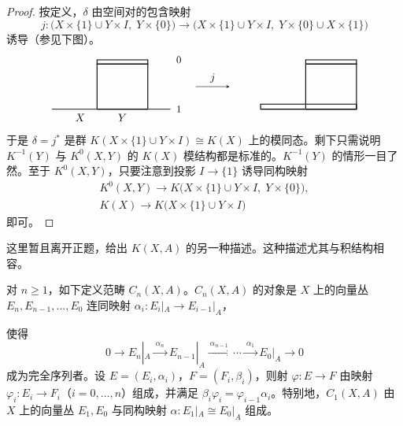 \begin{proof}
  按定义，$\delta$ 由空间对的包含映射
  \[
  j\colon\bigl(X\times\{1\}\cup Y\times I,\;Y\times\{0\}\bigr)\longrightarrow
  \bigl(X\times\{1\}\cup Y\times I,\;Y\times\{0\}\cup X\times\{1\}\bigr)
  \]
  诱导（参见下图）。
  \[
  \begin{tikzpicture}[baseline=(current bounding box.center),>=stealth,scale=0.9]
    \draw (0,0) -- (4.2,0);
    \draw[thick] (1.6,0) rectangle (3.4,1.6);
    \draw[thick] (1.6,1.6) rectangle (3.4,1.75);
    \draw (0,0) -- (4.2,0);
    \node at (4.5,1.75) {\small $0$};
    \node at (4.5,0) {\small $1$};
    \node at (1.0,-0.3) {$X$};
    \node at (2.5,-0.3) {$Y$};
    \draw[->] (5.1,0.8) -- (6.3,0.8) node[midway,above] {$j$};
    \begin{scope}[xshift=7.4cm]
      \draw[thick] (0,0) rectangle (3.4,0.18);
      \draw[thick] (1.6,0) rectangle (3.4,1.6);
      \draw[thick] (1.6,1.6) rectangle (3.4,1.75);
      \draw (0,0) -- (3.4,0);
    \end{scope}
  \end{tikzpicture}
  \]
  于是 $\delta=j^*$ 是群 $K(X\times\{1\}\cup Y\times I)\cong K(X)$ 上的模同态。剩下只需说明 $K^{-1}(Y)$ 与 $K^0(X,Y)$ 的 $K(X)$ 模结构都是标准的。$K^{-1}(Y)$ 的情形一目了然。至于 $K^0(X,Y)$，只要注意到投影 $I\to\{1\}$ 诱导同构映射
  \begin{gather*}
  K^0(X,Y)\to K\bigl(X\times\{1\}\cup Y\times I,\;Y\times\{0\}\bigr),\\
  K(X)\to K\bigl(X\times\{1\}\cup Y\times I\bigr)
  \end{gather*}
  即可。
\end{proof}

这里暂且离开正题，给出 $K(X,A)$ 的另一种描述。这种描述尤其与积结构相容。

对 $n\ge 1$，如下定义范畴 $C_n(X,A)$。$C_n(X,A)$ 的对象是 $X$ 上的向量丛 $E_n,E_{n-1},\dots,E_0$ 连同映射 $\alpha_i\colon E_i|_A\to E_{i-1}|_A$，

使得
\[
0\longrightarrow E_n|_A\xrightarrow{\ \alpha_n\ }E_{n-1}|_A\xrightarrow{\ \alpha_{n-1}\ }\cdots\xrightarrow{\ \alpha_1\ }E_0|_A\longrightarrow 0
\]
成为完全序列者。设 $E=(E_i,\alpha_i)$，$F=(F_i,\beta_i)$，则射 $\varphi\colon E\to F$ 由映射 $\varphi_i\colon E_i\to F_i$（$i=0,\dots,n$）组成，并满足 $\beta_i\varphi_i=\varphi_{i-1}\alpha_i$。特别地，$C_1(X,A)$ 由 $X$ 上的向量丛 $E_1,E_0$ 与同构映射 $\alpha\colon E_1|_A\cong E_0|_A$ 组成。

